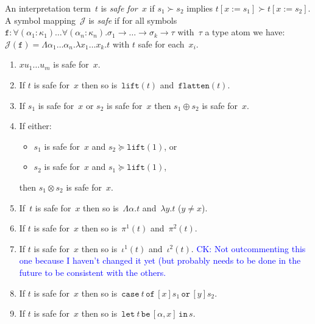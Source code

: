 \documentclass[runningheads,a4paper]{llncs}
\newcommand{\Termmap}{\mathcal{J}}
\newcommand{\arrtype}{\rightarrow}
\newcommand{\abs}[2]{\lambda #1.#2}
\newcommand{\tabs}[2]{\Lambda #1.#2}
\newcommand{\pair}[2]{\langle #1,#2 \rangle}
\newcommand{\expair}[2]{[#1,#2]}
\newcommand{\subst}[2]{#1:=#2}
\newcommand{\flatten}{\mathtt{flatten}}
\newcommand{\lift}{\mathtt{lift}}
\newcommand{\afun}{\mathtt{f}}
\newcommand{\xcase}[4]{\mathtt{case}_{#1}\,#2\,\mathtt{of}\,#3\,\mathtt{or}\,#4}
\newcommand{\xlet}[4]{\mathtt{let}_{#1}\,#2\,\mathtt{be}\,[#3]\,\mathtt{in}\,#4}
\newcommand{\CK}[1]{\textcolor{blue}{CK: #1}}
\begin{document}
\begin{definition}\normalfont
  An interpretation term~$t$ is \emph{safe for~$x$} if $s_1 \succ s_2$
  implies $t[\subst{x}{s_1}] \succ t[\subst{x}{s_2}]$. A symbol
  mapping~$\Termmap$ is \emph{safe} if for all symbols $\afun :
  \forall (\alpha_1 : \kappa_1) \ldots \forall (\alpha_n : \kappa_n)
  . \sigma_1 \arrtype \ldots \arrtype \sigma_k \arrtype \tau$
  with~$\tau$ a type atom we have: $\Termmap(\afun) = \tabs{\alpha_1
    \dots \alpha_n}{\abs{x_1 \dots x_k}{t}}$ with $t$ safe for
  each~$x_i$.
\end{definition}

\begin{lemma}
  \begin{enumerate}
  \item $x u_1 \ldots u_m$ is safe for~$x$.
  \item If $t$ is safe for~$x$ then so is~$\lift(t)$
    and~$\flatten(t)$.
  \item If $s_1$ is safe for~$x$ or $s_2$ is safe for~$x$ then $s_1
    \oplus s_2$ is safe for~$x$.
  \item If either:
    \begin{itemize}
    \item $s_1$ is safe for~$x$ and $s_2 \succeq \lift(1)$, or
    \item $s_2$ is safe for~$x$ and $s_1 \succeq \lift(1)$,
    \end{itemize}
    then $s_1 \otimes s_2$ is safe for~$x$.
  \item If~$t$ is safe for~$x$ then so is~$\tabs{\alpha}{t}$
    and~$\abs{y}{t}$ ($y \ne x$).
  \item If $t$ is safe for~$x$ then so is~$\pi^1(t)$ and~$\pi^2(t)$.
  \item If $t$ is safe for~$x$ then so is~$\iota^1(t)$ and~$\iota^2(t)$.
  \CK{Not outcommenting this one because I haven't changed it yet (but
  probably needs to be done in the future to be consistent with the
  others.}
  \item If $t$ is safe for~$x$ then so is~$\xcase{}{t}{[x]s_1}{[y]s_2}$.
  \item If $t$ is safe for~$x$ then so is~$\xlet{}{t}{\alpha,x}{s}$.
  \end{enumerate}
\end{lemma}
\end{document}
